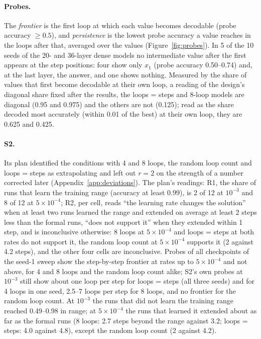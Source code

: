 \paragraph{Probes.} The \emph{frontier} is the first loop at which each value becomes decodable (probe accuracy
$\geq 0.5$), and \emph{persistence} is the lowest probe accuracy a value reaches in the loops after that, averaged
over the values (Figure~\ref{fig:probes}). In 5 of the 10 seeds of the 20- and 36-layer dense models no
intermediate value after the first appears at the step positions: four show only $x_1$ (probe accuracy 0.50--0.74)
and, at the last layer, the answer, and one shows nothing. Measured by the share of values that first become
decodable at their own loop, a reading of the design's diagonal share fixed after the results, the loops = steps and
8-loop models are diagonal (0.95 and 0.975) and the others are not (0.125); read as the share decoded most
accurately (within 0.01 of the best) at their own loop, they are 0.625 and 0.425.


\paragraph{S2.} Its plan identified the conditions with 4 and 8 loops, the random loop count and loops = steps as
extrapolating and left out $r = 2$ on the strength of a number corrected later (Appendix~\ref{app:deviations}). The
plan's readings: R1, the share of runs that learn the training range (accuracy at least 0.99), is 2 of 12 at $10^{-3}$
and 8 of 12 at $5\times10^{-4}$; R2, per cell, reads ``the learning rate changes the solution'' when at least two runs
learned the range and extended on average at least 2 steps less than the formal runs, ``does not support it'' when
they extended within 1 step, and is inconclusive otherwise: 8 loops at $5\times10^{-4}$ and loops = steps at both rates
do not support it, the random loop count at $5\times10^{-4}$ supports it (2 against 4.2 steps), and the other four
cells are inconclusive. Probes of
all checkpoints of the seed-1 sweep  show the step-by-step frontier at rates up to $5\times10^{-4}$ and
not above, for 4 and 8 loops and the random loop count alike; S2's own probes at $10^{-3}$ still show about one loop per
step for loops = steps (all three seeds) and for 4 loops in one seed, 2.5--7 loops per step for 8 loops, and no frontier
for the random loop count. At $10^{-3}$ the runs that did not learn the training range reached 0.49--0.98 in range; at $5\times10^{-4}$
the runs that learned it extended about as far as the formal runs (8 loops: 2.7
steps beyond the range against 3.2; loops = steps: 4.0 against 4.8), except the random loop count (2 against 4.2).

